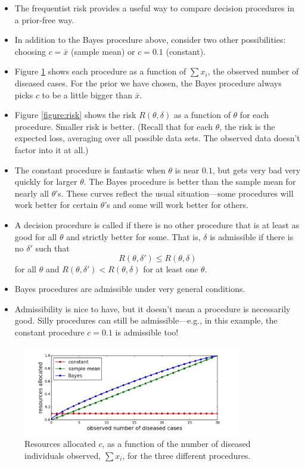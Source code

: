 \documentclass[12pt]{article}
\begin{document}
\begin{itemize}
\item The frequentist risk provides a useful way to compare decision procedures in a prior-free way.
\item In addition to the Bayes procedure above, consider two other possibilities: choosing $c = \bar x$ (sample mean) or $c=0.1$ (constant).
\item Figure \ref{figure:procedures} shows each procedure as a function of $\sum x_i$, the observed number of diseased cases. For the prior we have chosen, the Bayes procedure always picks $c$ to be a little bigger than $\bar x$.
\item Figure \ref{figure:risk} shows the risk $R(\theta,\delta)$ as a function of $\theta$ for each procedure. Smaller risk is better. (Recall that for each $\theta$, the risk is the expected loss, averaging over all possible data sets. The observed data doesn't factor into it at all.)
\item The constant procedure is fantastic when $\theta$ is near $0.1$, but gets very bad very quickly for larger $\theta$. The Bayes procedure is better than the sample mean for nearly all $\theta$'s. These curves reflect the usual situation---some procedures will work better for certain $\theta$'s and some will work better for others.
\item A decision procedure is called  if there is no other procedure that is at least as good for all $\theta$ and strictly better for some. That is, $\delta$ is admissible if there is no $\delta'$ such that 
$$R(\theta,\delta')\leq R(\theta,\delta)$$
for all $\theta$ and $R(\theta,\delta')< R(\theta,\delta)$ for at least one $\theta$.
\item Bayes procedures are admissible under very general conditions.
\item Admissibility is nice to have, but it doesn't mean a procedure is necessarily good. Silly procedures can still be admissible---e.g., in this example, the constant procedure $c = 0.1$ is admissible too!
\end{itemize}

\begin{figure}
  \begin{center}
    \includegraphics[width=0.85\textwidth]{procedures.png}
  \end{center}
  \caption{Resources allocated $c$, as a function of the number of diseased individuals observed, $\sum x_i$, for the three different procedures.}
  \label{figure:procedures}
\end{figure}
\end{document}
